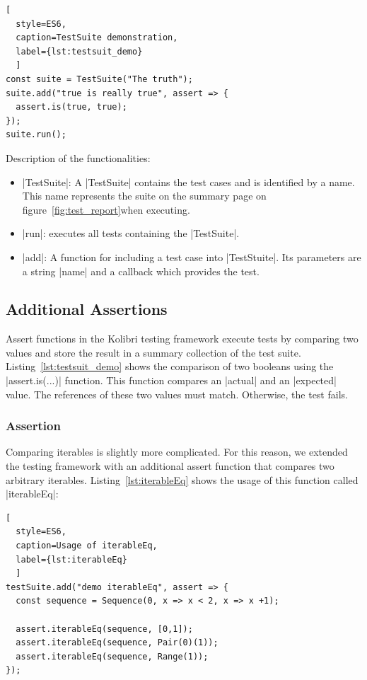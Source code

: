 \begin{lstlisting}[
  style=ES6, 
  caption=TestSuite demonstration,
  label={lst:testsuit_demo}
  ]
const suite = TestSuite("The truth");
suite.add("true is really true", assert => {
  assert.is(true, true);
});
suite.run();
\end{lstlisting}

Description of the functionalities: 

\begin{itemize}
  \item{|TestSuite|: A |TestSuite| contains the test cases and is identified by a
    name. This name represents the suite on the summary page on
  figure~\ref{fig:test_report}when executing.}
  \item{|run|: executes all tests containing the |TestSuite|.}
  \item{|add|: A function for including a test case into |TestStuite|. Its
      parameters are a string |name| and a callback which provides the test.}
\end{itemize}

\subsection{Additional Assertions}
\label{sub:Additional Assertions}

Assert functions in the Kolibri testing framework execute tests by comparing
two values and store the result in a summary collection of the test suite.
Listing~\ref{lst:testsuit_demo} shows the comparison of two booleans using the
|assert.is(...)| function.
This function compares an |actual| and an |expected| value. The references of
these two values must match. Otherwise, the test fails.

\subsubsection{Assertion}
\label{subsub:Assertion for Iterables}
Comparing iterables is slightly more complicated. For this reason, we extended
the testing framework with an additional assert function that compares two
arbitrary iterables. Listing~\ref{lst:iterableEq} shows the usage of this
function called |iterableEq|:

\begin{lstlisting}[
  style=ES6, 
  caption=Usage of iterableEq,
  label={lst:iterableEq}
  ]
testSuite.add("demo iterableEq", assert => {
  const sequence = Sequence(0, x => x < 2, x => x +1);

  assert.iterableEq(sequence, [0,1]);
  assert.iterableEq(sequence, Pair(0)(1));
  assert.iterableEq(sequence, Range(1));
});  
\end{lstlisting}

